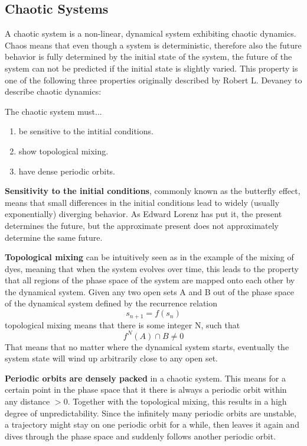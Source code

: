 \documentclass[main]{subfiles}
\begin{document}
\subsection{Chaotic Systems}
\label{subsec:chaotic-systems}

A chaotic system is a non-linear, dynamical system exhibiting chaotic dynamics. %
%
Chaos means that even though a system is deterministic, therefore also the future behavior is fully determined by the initial state of the system, the future of the system can not be predicted if the initial state is slightly varied. %
%
This property is one of the following three properties originally described by Robert L. Devaney \cite{bib:Devaney1989} to describe chaotic dynamics:

The chaotic system must...
\begin{enumerate}
\item be sensitive to the intitial conditions.
\item show topological mixing.
\item have dense periodic orbits.
\end{enumerate}

\textbf{Sensitivity to the initial conditions}, commonly known as the butterfly effect, means that small differences in the initial conditions lead to widely (usually exponentially) diverging behavior. %
%
As Edward Lorenz has put it, the present determines the future, but the approximate present does not approximately determine the same future.

\textbf{Topological mixing} can be intuitively seen as in the example of the mixing of dyes, meaning that when the system evolves over time, this leads to the property that all regions of the phase space of the system are mapped onto each other by the dynamical system. %
%
Given any two open sets A and B out of the phase space of the dynamical system defined by the recurrence relation \[s_{n+1} = f(s_n)\] topological mixing means that there is some integer N, such that \[f^N(A) \cap B \neq 0\] %
%
That means that no matter where the dynamical system starts, eventually the system state will wind up arbitrarily close to any open set.

\textbf{Periodic orbits are densely packed} in a chaotic system. %
%
This means for a certain point in the phase space that it there is always a periodic orbit within any distance \(> 0\). %
%
Together with the topological mixing, this results in a high degree of unpredictability. %
%
Since the infinitely many periodic orbits are unstable, a trajectory might stay on one periodic orbit for a while, then leaves it again and dives through the phase space and suddenly follows another periodic orbit.
\end{document}
